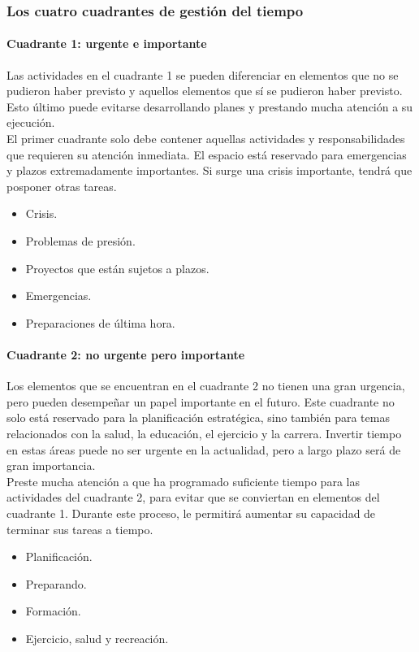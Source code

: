 \documentclass[10pt]{book}
\begin{document}
\subsubsection{Los cuatro cuadrantes de gestión del tiempo}
\paragraph{Cuadrante 1: urgente e importante}
Las actividades en el cuadrante 1 se pueden diferenciar en elementos que no se pudieron haber previsto y aquellos elementos que sí se pudieron haber previsto. Esto último puede evitarse desarrollando planes y prestando mucha atención a su ejecución.\\
El primer cuadrante solo debe contener aquellas actividades y responsabilidades que requieren su atención inmediata. El espacio está reservado para emergencias y plazos extremadamente importantes. Si surge una crisis importante, tendrá que posponer otras tareas.
\begin{center}
\begin{itemize}
\item Crisis.
\item Problemas de presión.
\item Proyectos que están sujetos a plazos.
\item Emergencias.
\item Preparaciones de última hora.
\end{itemize}
\end{center}

\paragraph{Cuadrante 2: no urgente pero importante}
Los elementos que se encuentran en el cuadrante 2 no tienen una gran urgencia, pero pueden desempeñar un papel importante en el futuro. Este cuadrante no solo está reservado para la planificación estratégica, sino también para temas relacionados con la salud, la educación, el ejercicio y la carrera. Invertir tiempo en estas áreas puede no ser urgente en la actualidad, pero a largo plazo será de gran importancia.\\
Preste mucha atención a que ha programado suficiente tiempo para las actividades del cuadrante 2, para evitar que se conviertan en elementos del cuadrante 1. Durante este proceso, le permitirá aumentar su capacidad de terminar sus tareas a tiempo.
\begin{center}
\begin{itemize}
\item Planificación.
\item Preparando.
\item Formación.
\item Ejercicio, salud y recreación.
\end{itemize}
\end{center}
\end{document}
